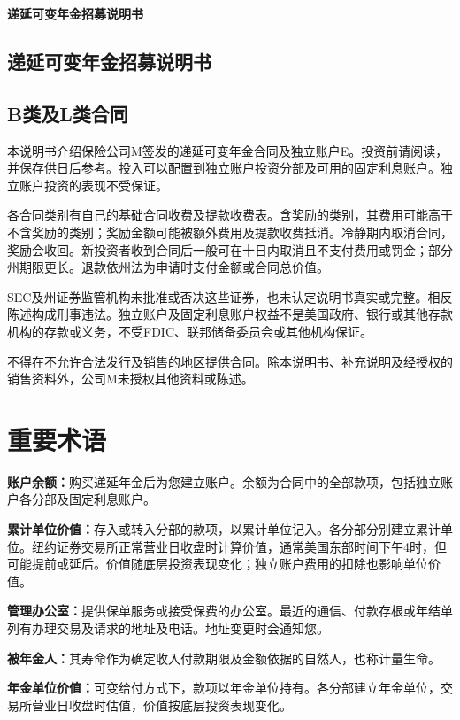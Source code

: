 \documentclass[UTF8,fontset=none,11pt,a4paper]{ctexart}
\begin{document}
{\noindent\fontsize{20}{25}\selectfont\bfseries 递延可变年金招募说明书\par}
\vspace{10pt}
\subsection*{递延可变年金招募说明书}
\subsection*{B类及L类合同}
本说明书介绍保险公司M签发的递延可变年金合同及独立账户E。投资前请阅读，并保存供日后参考。投入可以配置到独立账户投资分部及可用的固定利息账户。独立账户投资的表现不受保证。


各合同类别有自己的基础合同收费及提款收费表。含奖励的类别，其费用可能高于不含奖励的类别；奖励金额可能被额外费用及提款收费抵消。冷静期内取消合同，奖励会收回。新投资者收到合同后一般可在十日内取消且不支付费用或罚金；部分州期限更长。退款依州法为申请时支付金额或合同总价值。


SEC及州证券监管机构未批准或否决这些证券，也未认定说明书真实或完整。相反陈述构成刑事违法。独立账户及固定利息账户权益不是美国政府、银行或其他存款机构的存款或义务，不受FDIC、联邦储备委员会或其他机构保证。


不得在不允许合法发行及销售的地区提供合同。除本说明书、补充说明及经授权的销售资料外，公司M未授权其他资料或陈述。


\section*{重要术语}
\textbf{账户余额：}购买递延年金后为您建立账户。余额为合同中的全部款项，包括独立账户各分部及固定利息账户。


\textbf{累计单位价值：}存入或转入分部的款项，以累计单位记入。各分部分别建立累计单位。纽约证券交易所正常营业日收盘时计算价值，通常美国东部时间下午4时，但可能提前或延后。价值随底层投资表现变化；独立账户费用的扣除也影响单位价值。


\textbf{管理办公室：}提供保单服务或接受保费的办公室。最近的通信、付款存根或年结单列有办理交易及请求的地址及电话。地址变更时会通知您。


\textbf{被年金人：}其寿命作为确定收入付款期限及金额依据的自然人，也称计量生命。


\textbf{年金单位价值：}可变给付方式下，款项以年金单位持有。各分部建立年金单位，交易所营业日收盘时估值，价值按底层投资表现变化。
\end{document}
